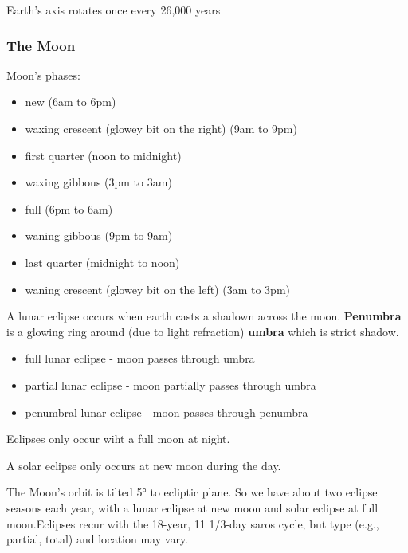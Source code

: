 \documentclass[12pt]{article}
\begin{document}
Earth's axis rotates once every 26,000 years

\subsubsection{The Moon}
Moon's phases:
\begin{itemize}
    \item new (6am to 6pm)
    \item waxing crescent (glowey bit on the right) (9am to 9pm)
    \item first quarter (noon to midnight)
    \item waxing gibbous (3pm to 3am)
    \item full (6pm to 6am)
    \item waning gibbous (9pm to 9am)
    \item last quarter (midnight to noon)
    \item waning crescent (glowey bit on the left) (3am to 3pm)
\end{itemize}

A lunar eclipse occurs when earth casts a shadown across the moon. \textbf{Penumbra} is a glowing ring around (due to light refraction) \textbf{umbra} which is strict shadow.
\begin{itemize}
    \item full lunar eclipse - moon passes through umbra
    \item partial lunar eclipse - moon partially passes through umbra
    \item penumbral lunar eclipse - moon passes through penumbra
\end{itemize}
Eclipses only occur wiht a full moon at night.

A solar eclipse only occurs at new moon during the day.

The Moon's orbit is tilted 5° to ecliptic plane. So we have about two eclipse seasons each year, with a lunar eclipse at new moon and solar eclipse at full moon.Eclipses recur with the 18-year, 11 1/3-day saros cycle, but type (e.g., partial, total) and location may vary.
\end{document}
